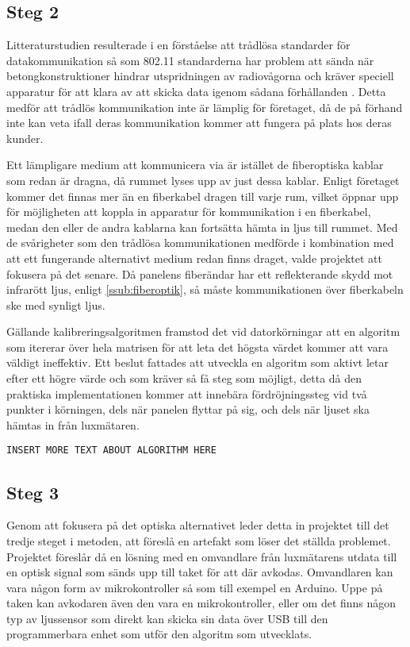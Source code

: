     \subsection{Steg 2} %
    \label{sub:steg_2}
        Litteraturstudien resulterade i en förståelse att trådlösa standarder för datakommunikation så som 802.11 standarderna har problem att sända när betongkonstruktioner hindrar utspridningen av radiovågorna och kräver speciell apparatur för att klara av att skicka data igenom sådana förhållanden \cite{11n}. Detta medför att trådlös kommunikation inte är lämplig för företaget, då de på förhand inte kan veta ifall deras kommunikation kommer att fungera på plats hos deras kunder. \bigskip

        Ett lämpligare medium att kommunicera via är istället de fiberoptiska kablar som redan är dragna, då rummet lyses upp av just dessa kablar. Enligt företaget kommer det finnas mer än en fiberkabel dragen till varje rum, vilket öppnar upp för möjligheten att koppla in apparatur för kommunikation i en fiberkabel, medan den eller de andra kablarna kan fortsätta hämta in ljus till rummet. Med de svårigheter som den trådlösa kommunikationen medförde i kombination med att ett fungerande alternativt medium redan finns draget, valde projektet att fokusera på det senare. Då panelens fiberändar har ett reflekterande skydd mot infrarött ljus, enligt \ref{ssub:fiberoptik}, så måste kommunikationen över fiberkabeln ske med synligt ljus.

        \bigskip

        Gällande kalibreringsalgoritmen framstod det vid datorkörningar att en algoritm som itererar över hela matrisen för att leta det högsta värdet kommer att vara väldigt ineffektiv. Ett beslut fattades att utveckla en algoritm som aktivt letar efter ett högre värde och som kräver så få steg som möjligt, detta då den praktiska implementationen kommer att innebära fördröjningssteg vid två punkter i körningen, dels när panelen flyttar på sig, och dels när ljuset ska hämtas in från luxmätaren.

        \texttt{INSERT MORE TEXT ABOUT ALGORITHM HERE} \bigskip


    \subsection{Steg 3} %
    \label{sub:steg_3}
        Genom att fokusera på det optiska alternativet leder detta in projektet till det tredje steget i metoden, att föreslå en artefakt som löser det ställda problemet. Projektet föreslår då en lösning med en omvandlare från luxmätarens utdata till en optisk signal som sänds upp till taket för att där avkodas. Omvandlaren kan vara någon form av mikrokontroller så som till exempel en Arduino. Uppe på taken kan avkodaren även den vara en mikrokontroller, eller om det finns någon typ av ljussensor som direkt kan skicka sin data över USB till den programmerbara enhet som utför den algoritm som utvecklats. \bigskip

